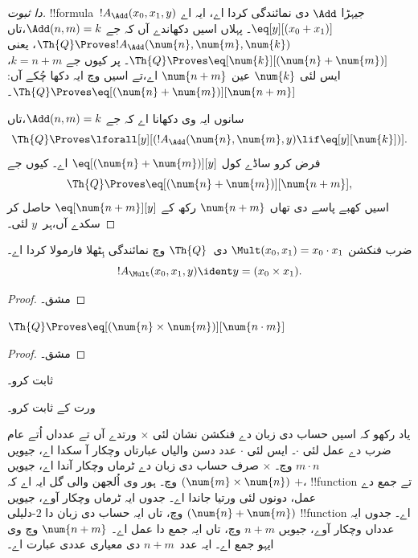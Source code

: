 \documentclass[../../../include/open-logic-section]{subfiles}
\begin{document}
\begin{proof}[ دا ثبوت]
!!{formula}~$!A_\Add(x_0, x_1, y)$ جیہڑا $\Add$ دی نمائندگی کردا اے، ایہ اے
$\eq[y][(x_0 + x_1)]$۔ پہلاں اسیں دکھاندے آں کہ جے
$\Add(n, m) = k$،تاں
$\Th{Q} \Proves !A_\Add(\num{n}, \num{m}, \num{k})$،
یعنی $\Th{Q}
\Proves \eq[\num{k}][(\num{n} + \num{m})]$۔ پر کیوں جے
$k = n + m$، ایس لئی $\num{k}$ عین $\num{n+m}$ اے،تے اسیں
 وچ ایہ دکھا چُکے آں:
$\Th{Q} \Proves \eq[(\num{n} +
  \num{m})][\num{n+m}]$۔

سانوں ایہ وی دکھانا اے کہ جے $\Add(n, m) = k$،تاں
\[
\Th{Q} \Proves \lforall[y][(!A_\Add(\num{n}, \num{m}, y) \lif
  \eq[y][\num{k}])].
\]
فرض کرو ساڈے کول $\eq[(\num{n} + \num{m})][y]$ اے۔
کیوں جے
\[
\Th{Q} \Proves \eq[(\num{n}+\num{m})][\num{n+m}],
\]
اسیں کھبے پاسے دی تھاں $\num{n+m}$ رکھ کے
$\eq[\num{n+m}][y]$ حاصل کر سکدے آں،ہر~$y$ لئی۔
\end{proof}

\begin{prop}
ضرب فنکشن $\Mult(x_0, x_1) = x_0 \cdot x_1$ دی~$\Th{Q}$
وچ نمائندگی ہِٹھلا فارمولا کردا اے۔
\[
  !A_{\Mult}(x_0, x_1, y) \ident y = (x_0 \times x_1).
\]
\end{prop}

\begin{proof} مشق۔ \end{proof}

\begin{lem}
$\Th{Q} \Proves \eq[(\num{n} \times \num{m})][\num{n \cdot m}]$
\end{lem}

\begin{proof} مشق۔ \end{proof}

\begin{prob}
 ثابت کرو۔
\end{prob}

\begin{prob}
 ورت کے
 ثابت کرو۔
\end{prob}

\begin{explain}
  یاد رکھو کہ اسیں حساب دی زبان دے فنکشن نشان لئی $\times$
ورتدے آں تے عدداں اُتے عام ضرب دے عمل لئی $\cdot$۔ ایس لئی
$\cdot$ عدد دسن والیاں عبارتاں وچکار آ سکدا اے، جیویں
$m \cdot n$ وچ۔ $\times$ صرف حساب دی زبان دے ٹرماں وچکار
آندا اے، جیویں $(\num{m} \times \num{n})$ وچ۔ ہور وی اُلجھن
والی گل ایہ اے کہ $+$، !!{function} تے جمع دے عمل، دونوں لئی
ورتیا جاندا اے۔ جدوں ایہ ٹرماں وچکار آوے، جیویں
$(\num{n} + \num{m})$ وچ، تاں ایہ حساب دی زبان دا $2$-دلیلی
!!{function} اے۔ جدوں ایہ عدداں وچکار آوے، جیویں $n+m$ وچ،
تاں ایہ جمع دا عمل اے۔ $\num{n+m}$ وچ وی ایہو جمع اے۔
ایہ عدد~$n+m$ دی معیاری عددی عبارت اے۔
\end{explain}
\end{document}
